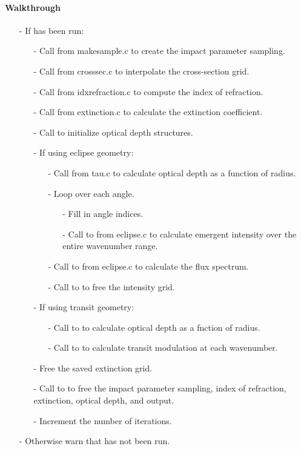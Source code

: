 \documentclass[letterpaper,12pt]{article}
\begin{document}
\paragraph{Walkthrough}
\begin{enumerate}[leftmargin=10pt, noitemsep, parsep=0pt, topsep=0ex]
\item[-] If  has been run:
\begin{enumerate}[leftmargin=10pt, noitemsep, parsep=0pt, topsep=0ex]
\item[-] Call  from makesample.c to create the impact parameter sampling.
\item[-] Call  from crosssec.c to interpolate the cross-section grid.
\item[-] Call  from idxrefraction.c to compute the index of refraction.
\item[-] Call  from extinction.c to calculate the extinction coefficient.
\item[-] Call  to initialize optical depth structures.
\item[-] If using eclipse geometry:
\begin{enumerate}[leftmargin=10pt, noitemsep, parsep=0pt, topsep=0ex]
\item[-] Call  from tau.c to calculate optical depth as a function of radius.
\item[-] Loop over each angle.
\begin{enumerate}[leftmargin=10pt, noitemsep, parsep=0pt, topsep=0ex]
\item[-] Fill in angle indices.
\item[-] Call to  from eclipse.c to calculate emergent intensity over the entire wavenumber range.
\end{enumerate}
\item[-] Call to  from eclipse.c to calculate the flux spectrum.
\item[-] Call to  to free the intensity grid.
\end{enumerate}
\item[-] If using transit geometry:
\begin{enumerate}[leftmargin=10pt, noitemsep, parsep=0pt, topsep=0ex]
\item[-] Call to  to calculate optical depth as a fnction of radius.
\item[-] Call to  to calculate transit modulation at each wavenumber.
\end{enumerate}
\item[-] Free the saved extinction grid.
\item[-] Call to  to free the impact parameter sampling, index of refraction, extinction, optical depth, and output.
\item[-] Increment the number of iterations.
\end{enumerate}
\item[-] Otherwise warn that  has not been run.
\end{enumerate}
\end{document}
